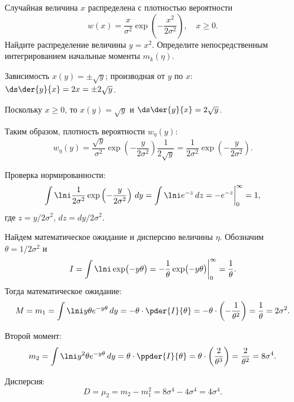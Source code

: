 \documentclass[pscyr]{hedwork}
\begin{document}
  \begin{task}{14}{
    Случайная величина \( x \) распределена с плотностью вероятности
    \[
      w(x) = \frac{x}{\sigma^2}\exp\left(-\frac{x^2}{2\sigma^2}\right),
        \quad x \ge 0.
    \]
    Найдите распределение величины \( y = x^2 \). Определите непосредственным
    интегрированием начальные моменты \( m_k(\eta) \).
  }

    Зависимость \( x(y) = \pm\sqrt{y} \); производная от \( y \) по \( x \):
    \( \ds \der{y}{x} = 2x = \pm 2\sqrt{y} \).

    Поскольку \( x \ge 0 \), то \( x(y) = \sqrt{y} \) и
    \( \ds \der{y}{x} = 2\sqrt{y} \).

    Таким образом, плотность вероятности \( w_\eta(y) \):
    \[
      w_\eta(y) = \frac{\sqrt{y}}{\sigma^2}
        \exp\left(-\frac{y}{2\sigma^2}\right)
        \frac{1}{2\sqrt{y}} =
        \frac{1}{2\sigma^2} \exp\left(-\frac{y}{2\sigma^2}\right).
    \]

    Проверка нормированности:
    \[
      \int\lni \frac{1}{2\sigma^2} \exp\left(-\frac{y}{2\sigma^2}\right)\,dy =
        \int\lni e^{-z}\,dz = -e^{-z}\bigg|_0^\infty = 1,
    \]
    где \( z = y / 2\sigma^2 \), \( dz = dy / 2\sigma^2 \).

    Найдем математическое ожидание и дисперсию величины \( \eta \). Обозначим
    \( \theta = 1 / 2\sigma^2 \) и
    \[
      I = \int\lni \exp\bigl(-y\theta\big) = -\frac{1}{\theta}
        \exp\bigl(-y\theta\big)\bigg|_0^\infty = \frac{1}{\theta}.
    \]
    Тогда математическое ожидание:
    \[
      M = m_1 = \int\lni y\theta e^{-y\theta}\,dy = -\theta\cdot\pder{I}{\theta}
        = -\theta\cdot\left(-\frac{1}{\theta^2}\right) = \frac{1}{\theta} =
        2\sigma^2.
    \]

    Второй момент:
    \[
      m_2 = \int\lni y^2\theta e^{-y\theta}\,dy = \theta\cdot\ppder{I}{\theta}
        = \theta\cdot\left(\frac{2}{\theta^3}\right) = \frac{2}{\theta^2} =
        8\sigma^4.
    \]

    Дисперсия:
    \[
      D = \mu_2 = m_2 - m_1^2 = 8\sigma^4 - 4\sigma^4 = 4\sigma^4.
    \]

  \end{task}
\end{document}

